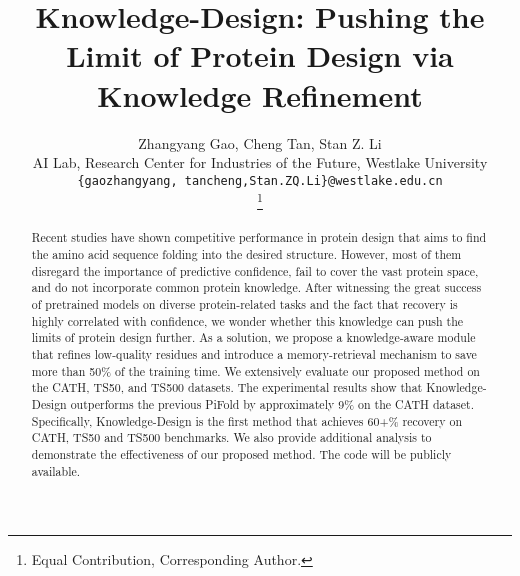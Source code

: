 \documentclass{article}
\author{Zhangyang Gao, Cheng Tan, Stan Z. Li\\
AI Lab, Research Center for Industries of the Future, Westlake University \\
\texttt{\{gaozhangyang, tancheng,Stan.ZQ.Li\}@westlake.edu.cn}\\
\thanks{Equal Contribution, Corresponding Author.}
}
\title{Knowledge-Design: Pushing the Limit of Protein Design via Knowledge Refinement}
\begin{document}
\maketitle

\vspace{-7mm}
\begin{abstract}
  \vspace{-2mm}
  Recent studies have shown competitive performance in protein design that aims to find the amino acid sequence folding into the desired structure. However, most of them disregard the importance of predictive confidence, fail to cover the vast protein space, and do not incorporate common protein knowledge. After witnessing the great success of pretrained models on diverse protein-related tasks and the fact that recovery is highly correlated with confidence, we wonder whether this knowledge can push the limits of protein design further. As a solution, we propose a knowledge-aware module that refines low-quality residues and introduce a memory-retrieval mechanism to save more than 50\% of the training time. We extensively evaluate our proposed method on the CATH, TS50, and TS500 datasets. The experimental results show that Knowledge-Design outperforms the previous PiFold by approximately 9\% on the CATH dataset. Specifically, Knowledge-Design is the first method that achieves 60+\% recovery on CATH, TS50 and TS500 benchmarks. We also provide additional analysis to demonstrate the effectiveness of our proposed method. The code will be publicly available.
\end{abstract}


\vspace{-6mm}
\end{document}
